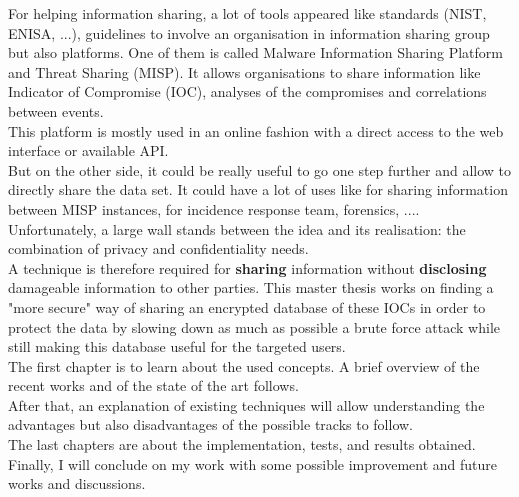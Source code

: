 \documentclass{eplmastersthesis}
\begin{document}
For helping information sharing, a lot of tools appeared like standards (NIST, ENISA, ...), guidelines to involve an organisation in information sharing group but also platforms. One of them is called Malware Information Sharing Platform and Threat Sharing (MISP). It allows organisations to share information like Indicator of Compromise (IOC), analyses of the compromises and correlations between events.\\
This platform is mostly used in an online fashion with a direct access to the web interface or available API.\\
But on the other side, it could be really useful to go one step further and allow to directly share the data set. It could have a lot of uses like for sharing information between MISP instances, for incidence response team, forensics, ....\\
Unfortunately, a large wall stands between the idea and its realisation: the combination of privacy and confidentiality needs.\\ 
A technique is therefore required for \textbf{sharing} information without \textbf{disclosing} damageable information to other parties. This master thesis works on finding a "more secure" way of sharing an encrypted database of these IOCs in order to protect the data by slowing down as much as possible a brute force attack while still making this database useful for the targeted users.\\

The first chapter is to learn about the used concepts. A brief overview of the recent works and of the state of the art follows.\\
After that, an explanation of existing techniques will allow understanding the advantages but also disadvantages of the possible tracks to follow.\\

The last chapters are about the implementation, tests, and results obtained.\\
Finally, I will conclude on my work with some possible improvement and future works and discussions.
\end{document}
